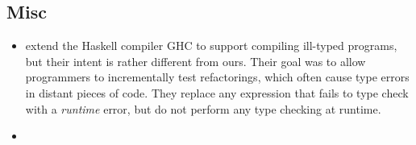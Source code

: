 
\subsection{Misc}
\begin{itemize}
\item \cite{vytiniotis_equality_2012} extend the Haskell compiler GHC to
  support compiling ill-typed programs, but their intent is rather
  different from ours. Their goal was to allow programmers to
  incrementally test refactorings, which often cause type errors in
  distant pieces of code. They replace any expression that fails to
  type check with a \emph{runtime} error, but do not perform
  any type checking at runtime.
\item \cite{perera_functional_2012}
\end{itemize}


